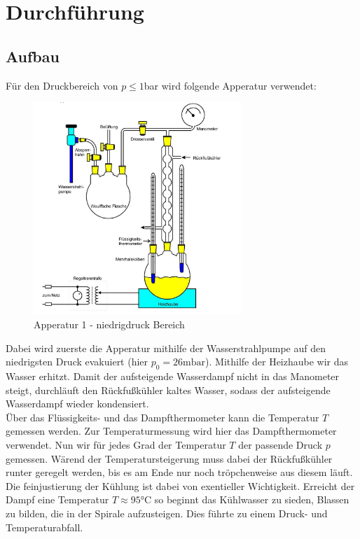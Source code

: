 \newpage
\section{Durchführung}
\label{sec:Durchfuehrung}
\subsection{Aufbau}
Für den Druckbereich von $p\leq 1$bar wird folgende Apperatur verwendet:
\begin{figure}[H]
    \centering
    \includegraphics[width=0.7\textwidth]{bilder/anlage1.jpg}
    \caption{Apperatur 1 - niedrigdruck Bereich \cite[181]{Anleitung}}
    \label{fig:app1}
\end{figure}
Dabei wird zuerste die Apperatur mithilfe der Wasserstrahlpumpe auf
den niedrigsten Druck evakuiert (hier $p_0=26\mathrm{mbar}$).
Mithilfe der Heizhaube wir das Wasser erhitzt. Damit der aufsteigende Wasserdampf
nicht in das Manometer steigt, durchläuft den Rückfußkühler kaltes Wasser,
sodass der aufsteigende Wasserdampf wieder kondensiert.\\
Über das Flüssigkeits- und das Dampfthermometer kann die Temperatur $T$ gemessen werden.
Zur Temperaturmessung wird hier das Dampfthermometer verwendet. 
Nun wir für jedes Grad der Temperatur $T$ der passende Druck $p$ gemessen.
Wärend der Temperatursteigerung muss dabei der Rückfußkühler runter geregelt werden, bis es am
Ende nur noch tröpchenweise aus diesem läuft.\\
Die feinjustierung der Kühlung ist dabei von exentieller Wichtigkeit.
Erreicht der Dampf eine Temperatur $T \approx 95°$C so beginnt
das Kühlwasser zu sieden, Blassen zu bilden, die in der Spirale
aufzusteigen. Dies führte zu einem Druck- und Temperaturabfall.\newpage

